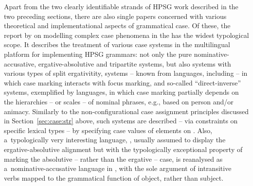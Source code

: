 \documentclass[output=paper
                ,modfonts
                ,nonflat
	        ,collection
	        ,collectionchapter
	        ,collectiontoclongg
 	        ,biblatex
                ,babelshorthands
                ,newtxmath
                ,draftmode
                ,colorlinks, citecolor=brown
]{./langsci/langscibook}
\begin{document}
\begin{exe}
\begin{xlist}
\begin{exe}
\begin{xlist}
Apart from the two clearly identifiable strands of HPSG work described in the two preceding sections, there are also single papers concerned with various theoretical and implementational aspects of grammatical case.  Of these, the report by \citet{drel:08} on modelling complex case phenomena in the  \citep{BFO2002a-u} has the widest typological scope.  It describes the treatment of various case systems in the multilingual platform for implementing HPSG grammars: not only the pure nominative-accusative, ergative-absolutive and tripartite systems, but also systems with various types of split ergativitity, systems – known from  languages, including  – in which case marking interacts with focus marking, and so-called “direct-inverse” systems, exemplified by  languages, in which case marking partially depends on the hierarchies – or scales – of nominal phrases, e.g., based on person and/or animacy.  Similarly to the non-configurational case assignment principles discussed in Section~\ref{sec:case:str} above, such systems are described – via constraints on specific lexical types – by specifying case values of elements on .  Also, a~typologically very interesting language, , usually assumed to display the ergative-absolutive alignment but with the typologically exceptional property of marking the absolutive – rather than the ergative – case, is reanalysed as a~nominative-accusative language in \citet{Crysmann2009b-u}, with the sole argument of intransitive verbs mapped to the grammatical function of object, rather than subject.


\end{xlist}
\end{exe}
\end{xlist}
\end{exe}
\end{document}
